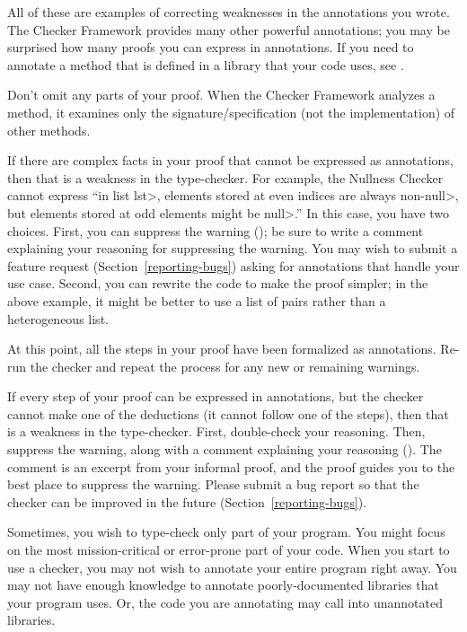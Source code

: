 All of these are examples of correcting weaknesses in the annotations you wrote.
The Checker Framework provides many other powerful annotations; you may
be surprised how many proofs you can express in annotations.
If you need to annotate a method that is defined in a
library that your code uses, see .

Don't omit any parts of your proof.  When the Checker Framework analyzes
a method, it examines only the signature/specification (not the implementation)
of other methods.

If there are complex facts in your proof that cannot be expressed as
annotations, then that is a weakness in the type-checker.  For example,
the Nullness Checker cannot express ``in list \<lst>, elements stored at
even indices are always non-\<null>, but elements stored at odd elements
might be \<null>.''  In this case, you have two choices.
%
First, you can suppress the warning
(); be sure to write a comment
explaining your reasoning for suppressing the warning.  You may wish to
submit a feature request (Section~\ref{reporting-bugs}) asking for
annotations that handle your use case.
%
Second, you can rewrite the code to make the proof simpler;
in the above example, it might be better to use a list of pairs
rather than a heterogeneous list.

At this point, all the steps in your proof have been formalized as
annotations.  Re-run the checker and repeat the process for any new or
remaining warnings.

If every step of your proof can be expressed in annotations, but the
checker cannot make one of the deductions (it cannot follow one of the
steps), then that is a weakness in the type-checker.  First, double-check
your reasoning.  Then, suppress the warning, along with a comment
explaining your reasoning ().
The comment is an excerpt from your informal proof, and the proof guides
you to the best place to suppress the warning.
Please submit a bug report so that the checker can be improved
in the future (Section~\ref{reporting-bugs}).





Sometimes, you wish to type-check only part of your program.
You might focus on the most mission-critical or error-prone part of your
code.  When you start to use a checker, you may not wish to annotate
your entire program right away.
You may not have
enough knowledge to annotate poorly-documented libraries that your program uses.
Or, the code you are annotating may call into unannotated libraries.

